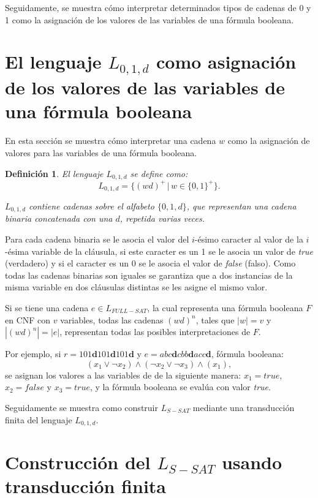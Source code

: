 \documentclass[12pt]{article}
\newtheorem{definition}{Definición}
\newcommand{\true}{\textit{true}}
\newcommand{\false}{\textit{false}}
\begin{document}
Seguidamente, se muestra cómo interpretar determinados tipos de cadenas de 0 y 1 como la asignación de los valores de las variables de una fórmula booleana.

\section{El lenguaje $L_{0,1,d}$ como asignación de los valores de las variables de una fórmula booleana}
\label{sec:intsat}

En esta sección se muestra cómo interpretar una cadena $w$ como la asignación de valores para las variables
de una fórmula booleana.

\begin{definition}
    El lenguaje $L_{0,1,d}$ se define como:
    $$L_{0,1,d}=\{(wd)^+\,|\,w\in\{0,1\}^+\}.$$
    
    $L_{0,1,d}$ contiene cadenas sobre el alfabeto $\{0,1,d\}$, que representan una cadena binaria concatenada con una $d$,
    repetida varias veces.
\end{definition}

Para cada cadena binaria se le asocia el valor del $i$-ésimo caracter al valor de la $i$-ésima variable
de la cláusula, si este caracter es un 1 se le asocia un valor de \true{} (verdadero) y si el caracter es un 
0 se le asocia el valor de \false{} (falso). Como todas las cadenas binarias son iguales se garantiza que a dos instancias de la misma variable en dos cláusulas distintas se les asigne el mismo valor.

Si se tiene una cadena $e\in L_{FULL-SAT}$, la cual representa una fórmula booleana $F$ en CNF con $v$ variables,
todas las cadenas $(wd)^n$, tales que $|w|=v$ y $|(wd)^n|=|e|$, representan todas las posibles interpretaciones
de $F$.

Por ejemplo, si $r=101\mathbf{d}101\mathbf{d}101\mathbf{d}$ y $e=abc\mathbf{d}cbb\mathbf{d}acc\mathbf{d}$, fórmula booleana:
$$(x_1\vee\neg x_2)\wedge (\neg x_2 \vee \neg x_3)\wedge (x_1),$$
se asignan los valores a las variables de de la siguiente manera: $x_1=true$, $x_2=false$ y $x_3=true$,
y la fórmula booleana se evalúa con valor \true{}.

Seguidamente se muestra como construir $L_{S-SAT}$ mediante una transducción finita del lenguaje $L_{0,1,d}$.

\section{Construcción del $L_{S-SAT}$ usando transducción finita}
\end{document}
